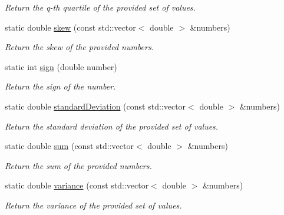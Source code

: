 \begin{DoxyCompactItemize}
\begin{DoxyCompactList}\small\item\em Return the q-\/th quartile of the provided set of values. \end{DoxyCompactList}\item 
static double \hyperlink{classmultiscale_1_1Numeric_a3e6b145db3ae9d7d21c3992353211125}{skew} (const std\-::vector$<$ double $>$ \&numbers)
\begin{DoxyCompactList}\small\item\em Return the skew of the provided numbers. \end{DoxyCompactList}\item 
static int \hyperlink{classmultiscale_1_1Numeric_a2b3058c5ad27aaaef338a29b96cdbced}{sign} (double number)
\begin{DoxyCompactList}\small\item\em Return the sign of the number. \end{DoxyCompactList}\item 
static double \hyperlink{classmultiscale_1_1Numeric_aa842f3143ada026759ec0474816c97ae}{standard\-Deviation} (const std\-::vector$<$ double $>$ \&numbers)
\begin{DoxyCompactList}\small\item\em Return the standard deviation of the provided set of values. \end{DoxyCompactList}\item 
static double \hyperlink{classmultiscale_1_1Numeric_aca9366c38b9b992793dd364b8e421bbd}{sum} (const std\-::vector$<$ double $>$ \&numbers)
\begin{DoxyCompactList}\small\item\em Return the sum of the provided numbers. \end{DoxyCompactList}\item 
static double \hyperlink{classmultiscale_1_1Numeric_a91bf7963069d7a51f01dff965508039c}{variance} (const std\-::vector$<$ double $>$ \&numbers)
\begin{DoxyCompactList}\small\item\em Return the variance of the provided set of values. \end{DoxyCompactList}\end{DoxyCompactItemize}

